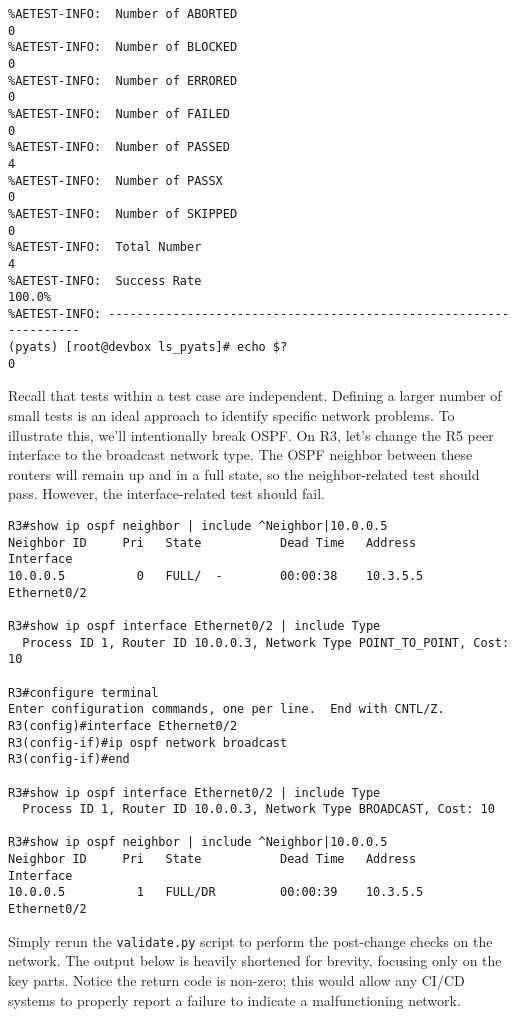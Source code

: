 \begin{verbatim}
%AETEST-INFO:  Number of ABORTED                                              0
%AETEST-INFO:  Number of BLOCKED                                              0
%AETEST-INFO:  Number of ERRORED                                              0
%AETEST-INFO:  Number of FAILED                                               0
%AETEST-INFO:  Number of PASSED                                               4
%AETEST-INFO:  Number of PASSX                                                0
%AETEST-INFO:  Number of SKIPPED                                              0
%AETEST-INFO:  Total Number                                                   4
%AETEST-INFO:  Success Rate                                              100.0%
%AETEST-INFO: ------------------------------------------------------------------
(pyats) [root@devbox ls_pyats]# echo $?
0
\end{verbatim}

Recall that tests within a test case are independent. Defining a larger number
of small tests is an ideal approach to identify specific network problems. To
illustrate this, we'll intentionally break OSPF\@. On R3, let's change the R5 peer
interface to the broadcast network type. The OSPF neighbor between these routers
will remain up and in a full state, so the neighbor-related test should pass.
However, the interface-related test should fail.

\begin{verbatim}
R3#show ip ospf neighbor | include ^Neighbor|10.0.0.5
Neighbor ID     Pri   State           Dead Time   Address         Interface
10.0.0.5          0   FULL/  -        00:00:38    10.3.5.5        Ethernet0/2

R3#show ip ospf interface Ethernet0/2 | include Type
  Process ID 1, Router ID 10.0.0.3, Network Type POINT_TO_POINT, Cost: 10

R3#configure terminal
Enter configuration commands, one per line.  End with CNTL/Z.
R3(config)#interface Ethernet0/2
R3(config-if)#ip ospf network broadcast
R3(config-if)#end

R3#show ip ospf interface Ethernet0/2 | include Type
  Process ID 1, Router ID 10.0.0.3, Network Type BROADCAST, Cost: 10

R3#show ip ospf neighbor | include ^Neighbor|10.0.0.5
Neighbor ID     Pri   State           Dead Time   Address         Interface
10.0.0.5          1   FULL/DR         00:00:39    10.3.5.5        Ethernet0/2
\end{verbatim}

Simply rerun the \verb|validate.py| script to perform the post-change checks on
the network. The output below is heavily shortened for brevity, focusing only on
the key parts. Notice the return code is non-zero; this would allow any CI/CD
systems to properly report a failure to indicate a malfunctioning network.

